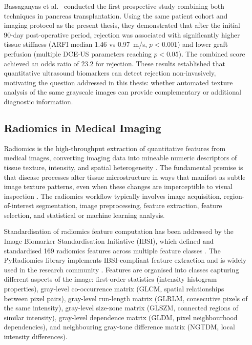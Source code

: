 Bassaganyas et al.\ \cite{bassaganyas2025} conducted the first prospective study combining both techniques in pancreas transplantation. Using the same patient cohort and imaging protocol as the present thesis, they demonstrated that after the initial 90-day post-operative period, rejection was associated with significantly higher tissue stiffness (ARFI median 1.46 vs 0.97~m/s, $p < 0.001$) and lower graft perfusion (multiple DCE-US parameters reaching $p < 0.05$). The combined score achieved an odds ratio of 23.2 for rejection. These results established that quantitative ultrasound biomarkers can detect rejection non-invasively, motivating the question addressed in this thesis: whether automated texture analysis of the same grayscale images can provide complementary or additional diagnostic information.

\subsection{Radiomics in Medical Imaging}

Radiomics is the high-throughput extraction of quantitative features from medical images, converting imaging data into mineable numeric descriptors of tissue texture, intensity, and spatial heterogeneity \cite{lambin2012}. The fundamental premise is that disease processes alter tissue microstructure in ways that manifest as subtle image texture patterns, even when these changes are imperceptible to visual inspection \cite{gillies2016}. The radiomics workflow typically involves image acquisition, region-of-interest segmentation, image preprocessing, feature extraction, feature selection, and statistical or machine learning analysis.

Standardisation of radiomics feature computation has been addressed by the Image Biomarker Standardisation Initiative (IBSI), which defined and standardised 169 radiomics features across multiple feature classes \cite{zwanenburg2020}. The PyRadiomics library implements IBSI-compliant feature extraction and is widely used in the research community \cite{vanGriethuysen2017}. Features are organised into classes capturing different aspects of the image: first-order statistics (intensity histogram properties), gray-level co-occurrence matrix (GLCM, spatial relationships between pixel pairs), gray-level run-length matrix (GLRLM, consecutive pixels of the same intensity), gray-level size-zone matrix (GLSZM, connected regions of similar intensity), gray-level dependence matrix (GLDM, pixel neighbourhood dependencies), and neighbouring gray-tone difference matrix (NGTDM, local intensity differences).

